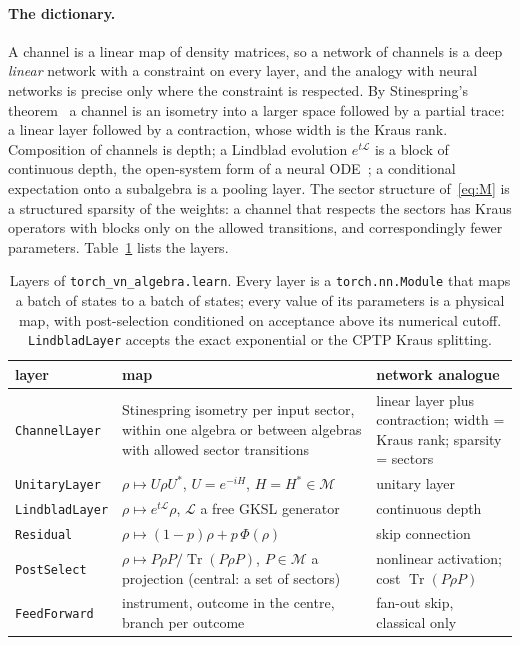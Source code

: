 \documentclass[11pt]{article}
\DeclareMathOperator{\Tr}{Tr}
\newcommand{\M}{\mathcal{M}}
\begin{document}
\paragraph{The dictionary.} A channel is a linear map of density matrices, so a network of channels is a deep
\emph{linear} network with a constraint on every layer, and the analogy with neural networks is precise only where
the constraint is respected. By Stinespring's theorem~\cite{stinespring1955} a channel is an isometry into a larger
space followed by a partial trace: a linear layer followed by a contraction, whose width is the Kraus rank. Composition
of channels is depth; a Lindblad evolution $e^{t\mathcal L}$ is a block of continuous depth, the open-system form of a
neural ODE~\cite{chen2018,e2017}; a conditional expectation onto a subalgebra is a pooling layer. The sector structure
of~\eqref{eq:M} is a structured sparsity of the weights: a channel that respects the sectors has Kraus operators with
blocks only on the allowed transitions, and correspondingly fewer parameters. Table~\ref{tab:learn} lists the layers.

\begin{table}[t]
\centering\footnotesize
\begin{tabular}{p{}p{}p{}}
\toprule
layer & map & network analogue\\
\midrule
\texttt{ChannelLayer} & Stinespring isometry per input sector, within one algebra or between algebras with allowed
sector transitions & linear layer plus contraction; width = Kraus rank; sparsity = sectors\\
\texttt{UnitaryLayer} & $\rho\mapsto U\rho U^*$, $U=e^{-iH}$, $H=H^*\in\M$ & unitary layer~\cite{arjovsky2016}\\
\texttt{LindbladLayer} & $\rho\mapsto e^{t\mathcal L}\rho$, $\mathcal L$ a free GKSL generator & continuous depth~\cite{chen2018}\\
\texttt{Residual} & $\rho\mapsto(1-p)\rho+p\,\Phi(\rho)$ & skip connection~\cite{he2016}\\
\texttt{PostSelect} & $\rho\mapsto P\rho P/\Tr(P\rho P)$, $P\in\M$ a projection (central: a set of sectors) &
nonlinear activation; cost $\Tr(P\rho P)$\\
\texttt{FeedForward} & instrument, outcome in the centre, branch per outcome & fan-out skip, classical only\\
\bottomrule
\end{tabular}
\caption{Layers of \texttt{torch\_vn\_algebra.learn}. Every layer is a \texttt{torch.nn.Module} that maps a batch of
states to a batch of states; every value of its parameters is a physical map, with post-selection conditioned on
acceptance above its numerical cutoff. \texttt{LindbladLayer} accepts the exact exponential or the CPTP Kraus splitting.}
\label{tab:learn}
\end{table}
\end{document}
